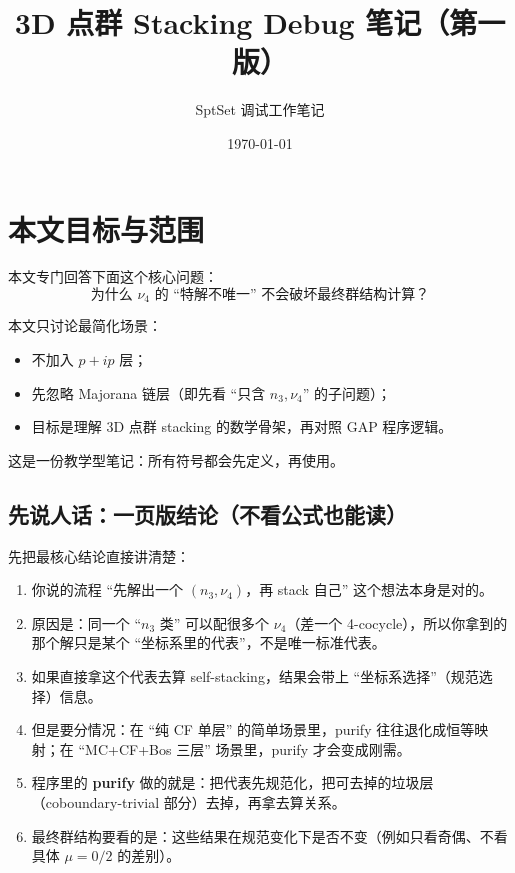 \documentclass[a4paper,fontset=ubuntu,12pt]{ctexart}
\title{3D 点群 Stacking Debug 笔记（第一版）}
\author{SptSet 调试工作笔记}
\date{\today}
\begin{document}
\maketitle
\tableofcontents

\section{本文目标与范围}
\label{sec:goal}

本文专门回答下面这个核心问题：
\begin{equation}
\text{为什么 }\nu_4\text{ 的 ``特解不唯一'' 不会破坏最终群结构计算？}
\label{eq:main-question}
\end{equation}

本文只讨论最简化场景：
\begin{itemize}
\item 不加入 $p+ip$ 层；
\item 先忽略 Majorana 链层（即先看 ``只含 $n_3,\nu_4$'' 的子问题）；
\item 目标是理解 3D 点群 stacking 的数学骨架，再对照 GAP 程序逻辑。
\end{itemize}

这是一份教学型笔记：所有符号都会先定义，再使用。

\subsection{先说人话：一页版结论（不看公式也能读）}
\label{sec:human-summary}

先把最核心结论直接讲清楚：
\begin{enumerate}
\item 你说的流程 ``先解出一个 $(n_3,\nu_4)$，再 stack 自己'' 这个想法本身是对的。
\item 原因是：同一个 ``$n_3$ 类'' 可以配很多个 $\nu_4$（差一个 4-cocycle），所以你拿到的那个解只是某个 ``坐标系里的代表''，不是唯一标准代表。
\item 如果直接拿这个代表去算 self-stacking，结果会带上 ``坐标系选择''（规范选择）信息。
\item 但是要分情况：在 ``纯 CF 单层'' 的简单场景里，purify 往往退化成恒等映射；在 ``MC+CF+Bos 三层'' 场景里，purify 才会变成刚需。
\item 程序里的 \textbf{purify} 做的就是：把代表先规范化，把可去掉的垃圾层（coboundary-trivial 部分）去掉，再拿去算关系。
\item 最终群结构要看的是：这些结果在规范变化下是否不变（例如只看奇偶、不看具体 $\mu=0/2$ 的差别）。
\end{enumerate}
\end{document}
